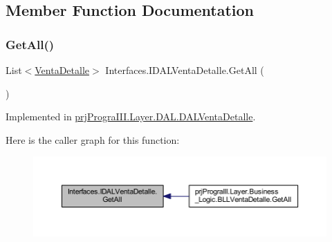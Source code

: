 \subsection{Member Function Documentation}
\hypertarget{interface_interfaces_1_1_i_d_a_l_venta_detalle_a47e9941b4a7cc3e41571940ca4d930fa}{}\label{interface_interfaces_1_1_i_d_a_l_venta_detalle_a47e9941b4a7cc3e41571940ca4d930fa} 
\subsubsection{\texorpdfstring{Get\+All()}{GetAll()}}
{\footnotesize\ttfamily List$<$\hyperlink{classprj_progra_i_i_i_1_1_layer_1_1_entities_1_1_venta_detalle}{Venta\+Detalle}$>$ Interfaces.\+I\+D\+A\+L\+Venta\+Detalle.\+Get\+All (\begin{DoxyParamCaption}{ }\end{DoxyParamCaption})}



Implemented in \hyperlink{classprj_progra_i_i_i_1_1_layer_1_1_d_a_l_1_1_d_a_l_venta_detalle_ae8473568c2fc6a75b57018056e29f39a}{prj\+Progra\+I\+I\+I.\+Layer.\+D\+A\+L.\+D\+A\+L\+Venta\+Detalle}.

Here is the caller graph for this function\+:
\nopagebreak
\begin{figure}[H]
\begin{center}
\leavevmode
\includegraphics[width=350pt]{interface_interfaces_1_1_i_d_a_l_venta_detalle_a47e9941b4a7cc3e41571940ca4d930fa_icgraph}
\end{center}
\end{figure}
\hypertarget{interface_interfaces_1_1_i_d_a_l_venta_detalle_a9d92a5b36829f84101bdcb0c5ae5eb3a}{}\label{interface_interfaces_1_1_i_d_a_l_venta_detalle_a9d92a5b36829f84101bdcb0c5ae5eb3a} 
